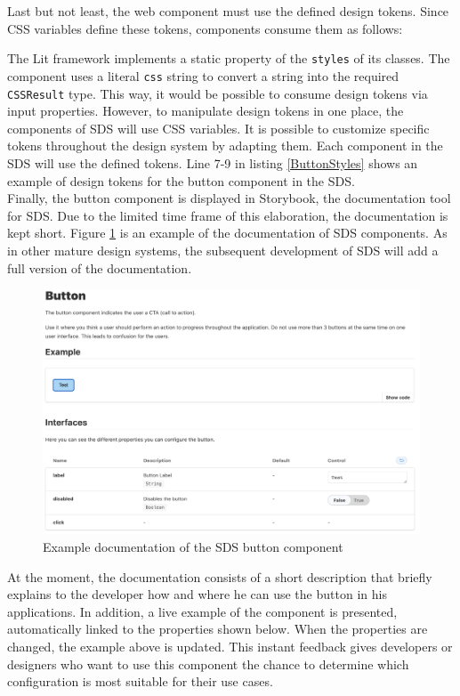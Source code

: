 Last but not least, the web component must use the defined design tokens. Since \ac{CSS} variables define these tokens, components consume them as follows: 

The Lit framework implements a static property of the \texttt{styles} of its classes. The component uses a literal \texttt{css} string to convert a string into the required \texttt{CSSResult} type. This way, it would be possible to consume design tokens via input properties. However, to manipulate design tokens in one place, the components of \ac{SDS} will use \ac{CSS} variables. It is possible to customize specific tokens throughout the design system by adapting them. Each component in the \ac{SDS} will use the defined tokens. Line 7-9 in listing \ref{ButtonStyles} shows an example of design tokens for the button component in the \ac{SDS}. \\
Finally, the button component is displayed in Storybook, the documentation tool for \ac{SDS}. Due to the limited time frame of this elaboration, the documentation is kept short. Figure \ref{storybook_button} is an example of the documentation of \ac{SDS} components. As in other mature design systems, the subsequent development of \ac{SDS} will add a full version of the documentation. \\
\begin{figure}[htbp]
    \centerline{\includegraphics[width=\linewidth]{images/storybook_button.png}}
    \caption{Example documentation of the \ac{SDS} button component}
    \label{storybook_button}
\end{figure}
At the moment, the documentation consists of a short description that briefly explains to the developer how and where he can use the button in his applications. In addition, a live example of the component is presented, automatically linked to the properties shown below. When the properties are changed, the example above is updated. This instant feedback gives developers or designers who want to use this component the chance to determine which configuration is most suitable for their use cases. \\
